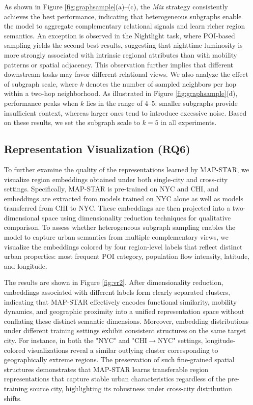 As shown in Figure \ref{fig:graphsample}(a)–(c), the \textit{Mix} strategy consistently achieves the best performance, indicating that heterogeneous subgraphs enable the model to aggregate complementary relational signals and learn richer region semantics. An exception is observed in the Nightlight task, where POI-based sampling yields the second-best results, suggesting that nighttime luminosity is more strongly associated with intrinsic regional attributes than with mobility patterns or spatial adjacency. This observation further implies that different downstream tasks may favor different relational views. We also analyze the effect of subgraph scale, where $k$ denotes the number of sampled neighbors per hop within a two-hop neighborhood. As illustrated in Figure \ref{fig:graphsample}(d), performance peaks when $k$ lies in the range of 4–5: smaller subgraphs provide insufficient context, whereas larger ones tend to introduce excessive noise. Based on these results, we set the subgraph scale to $k=5$ in all experiments.

\subsection{Representation Visualization (RQ6)}

To further examine the quality of the representations learned by MAP-STAR, we visualize region embeddings obtained under both single-city and cross-city settings. Specifically, MAP-STAR is pre-trained on NYC and CHI, and embeddings are extracted from models trained on NYC alone as well as models transferred from CHI to NYC. These embeddings are then projected into a two-dimensional space using dimensionality reduction techniques for qualitative comparison. To assess whether heterogeneous subgraph sampling enables the model to capture urban semantics from multiple complementary views, we visualize the embeddings colored by four region-level labels that reflect distinct urban properties: most frequent POI category, population flow intensity, latitude, and longitude.

The results are shown in Figure \ref{fig:vr2}. After dimensionality reduction, embeddings associated with different labels form clearly separated clusters, indicating that MAP-STAR effectively encodes functional similarity, mobility dynamics, and geographic proximity into a unified representation space without conflating these distinct semantic dimensions. Moreover, embedding distributions under different training settings exhibit consistent structures on the same target city. For instance, in both the "NYC" and "CHI$\rightarrow$NYC" settings, longitude-colored visualizations reveal a similar outlying cluster corresponding to geographically extreme regions. The preservation of such fine-grained spatial structures demonstrates that MAP-STAR learns transferable region representations that capture stable urban characteristics regardless of the pre-training source city, highlighting its robustness under cross-city distribution shifts.